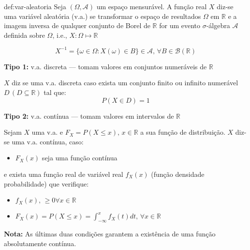 \begin{theo}{def:var-aleatoria}\label{def:var-aleatoria}
    Seja $(\Omega, \mathcal{A})$ um espaço mensurável. A função real $X$ diz-se uma variável aleatória (v.a.) se transformar o espaço de resultados $\Omega$ em $\mathbb{R}$ e a imagem inversa de qualquer conjunto de Borel de $\mathbb{R}$ for um evento $\sigma$-álgebra $\mathcal{A}$ definida sobre $\Omega$, i.e., $X: \Omega \mapsto \mathbb{R}$

    $$
        X^{-1} = \{\omega \in \Omega: X(\omega) \in B\} \in \mathcal{A},\, \forall B \in \mathcal{B}(\mathbb{R}) 
    $$
\end{theo}

\noindent\textbf{Tipo 1:} v.a. discreta --- tomam valores em conjuntos numeráveis de $\mathbb{R}$

\begin{mdframed}
$X$ diz se uma v.a. discreta caso exista um conjunto finito ou infinito numerável $D\, (D \subseteq \mathbb{R})$ tal que:
$$
    P(X \in D) = 1
$$
\end{mdframed}


\noindent\textbf{Tipo 2:} v.a. contínua --- tomam valores em intervalos de $\mathbb{R}$

\begin{mdframed}
   Sejam $X$ uma v.a. e $F_X = P(X \leq x),\, x \in \mathbb{R}$ a sua função de distribuição. $X$ diz-se uma v.a. contínua, caso:

   \begin{itemize}
       \item $F_X(x)$ seja uma função contínua
   \end{itemize}

   \noindent e exista uma função real de variável real $f_X(x)$ (função densidade probabilidade) que verifique:

   \begin{itemize}
       \item $f_X(x),\, \ge 0 \forall x \in \mathbb{R}$
       \item $F_X(x) = P(X \leq x) = \int_{-\infty}^x f_X(t)dt,\, \forall x \in \mathbb{R}$
   \end{itemize}

\noindent\textbf{Nota:} As últimas duas condições garantem a existência de uma função absolutamente contínua.
\end{mdframed}

